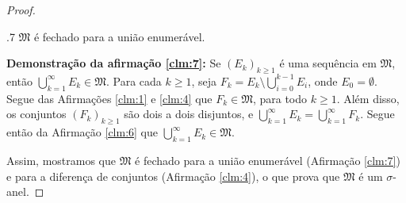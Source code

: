 \begin{proof}
    \begin{claim}{.}{7}
        $\mathfrak{M}$ é fechado para a união enumerável.
    \end{claim}
    \textbf{Demonstração da afirmação \ref{clm:7}:} Se $(E_k)_{k\geq 1}$ é uma sequência em $\mathfrak{M}$, então $\bigcup_{k=1}^{\infty} E_k \in \mathfrak{M}$. Para cada $k \geq 1$, seja $F_k = E_k \setminus \bigcup_{i=0}^{k-1} E_i$, onde $E_0 = \emptyset$. Segue das Afirmações \ref{clm:1} e \ref{clm:4} que $F_k \in \mathfrak{M}$, para todo $k \geq 1$. Além disso, os conjuntos $(F_k)_{k\geq 1}$ são dois a dois disjuntos, e $\bigcup_{k=1}^{\infty} E_k = \bigcup_{k=1}^{\infty} F_k$. Segue então da Afirmação \ref{clm:6} que $\bigcup_{k=1}^{\infty} E_k \in \mathfrak{M}$.

    Assim, mostramos que $\mathfrak{M}$ é fechado para a união enumerável (Afirmação \ref{clm:7}) e para a diferença de conjuntos (Afirmação \ref{clm:4}), o que prova que $\mathfrak{M}$ é um $\sigma$-anel.
\end{proof}

